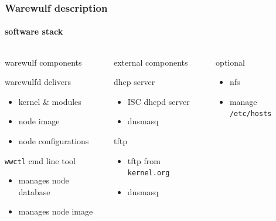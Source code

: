\documentclass[aspectratio=169]{beamer}
\begin{document}
\begin{frame}[fragile]
\frametitle{Warewulf description}
\framesubtitle{software stack}
\begin{columns}
  \begin{block}{warewulf components}
  \hspace*{.1\linewidth}\begin{minipage}{.8\linewidth}
  \begin{block}{warewulfd delivers}
    \begin{itemize}
      \item kernel \& modules
      \item node image
      \item node configurations
    \end{itemize}
  \end{block}
  \begin{block}{\texttt{wwctl} cmd line tool}
    \begin{itemize}
      \item manages node database
      \item manages node image
    \end{itemize}
  \end{block}
  \vspace*{1cm}
  \end{minipage}
  \end{block}
  \begin{block}{external components}
  \hspace*{.1\linewidth}\begin{minipage}{.8\linewidth}
    \begin{block}{dhcp server}
      \begin{itemize}
      \item ISC dhcpd server
      \item dnsmasq
    \end{itemize}
    \end{block}
    \begin{block}{tftp}
      \begin{itemize}
      \item tftp from \texttt{kernel.org}
      \item dnsmasq
    \end{itemize}
    \end{block}
  \end{minipage} 
  \end{block}
  \begin{block}{optional}
    \begin{itemize}
      \item nfs
      \item manage \texttt{/etc/hosts}
    \end{itemize}
  \end{block}
\end{columns}
\end{frame}
\end{document}
